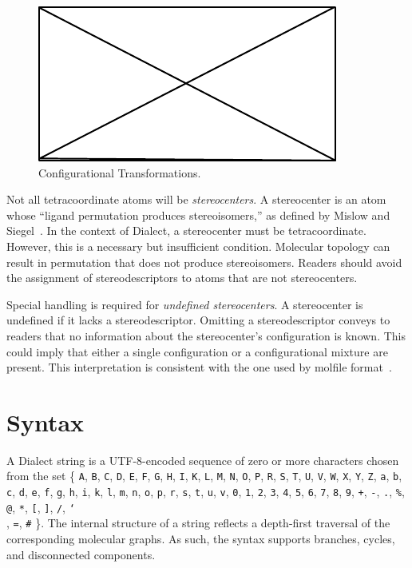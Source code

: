 \documentclass{article}
\def\ttt{\texttt}
\begin{document}
\begin{figure}
    \centering
    \includegraphics{filler}
    \caption{Configurational Transformations.}
    \label{fig:iconfigurational-transformations}
\end{figure}

Not all tetracoordinate atoms will be \textit{stereocenters}. A stereocenter is an atom whose \enquote{ligand permutation produces stereoisomers,} as defined by Mislow and Siegel~\cite{mislow:1984}. In the context of Dialect, a stereocenter must be tetracoordinate. However, this is a necessary but insufficient condition. Molecular topology can result in permutation that does not produce stereoisomers. Readers should avoid the assignment of stereodescriptors to atoms that are not stereocenters.

Special handling is required for \textit{undefined stereocenters}. A stereocenter is undefined if it lacks a stereodescriptor. Omitting a stereodescriptor conveys to readers that no information about the stereocenter's configuration is known. This could imply that either a single configuration or a configurational mixture are present. This interpretation is consistent with the one used by molfile format~\cite{ctfileFormats}.

\section*{Syntax}

A Dialect string is a UTF-8-encoded sequence of zero or more characters chosen from the set \{ \ttt{A}, \ttt{B}, \ttt{C}, \ttt{D}, \ttt{E}, \ttt{F}, \ttt{G}, \ttt{H}, \ttt{I}, \ttt{K}, \ttt{L}, \ttt{M}, \ttt{N}, \ttt{O}, \ttt{P}, \ttt{R}, \ttt{S}, \ttt{T}, \ttt{U}, \ttt{V}, \ttt{W}, \ttt{X}, \ttt{Y}, \ttt{Z}, \ttt{a}, \ttt{b}, \ttt{c}, \ttt{d}, \ttt{e}, \ttt{f}, \ttt{g}, \ttt{h}, \ttt{i}, \ttt{k}, \ttt{l}, \ttt{m}, \ttt{n}, \ttt{o}, \ttt{p}, \ttt{r}, \ttt{s}, \ttt{t}, \ttt{u}, \ttt{v}, \ttt{0}, \ttt{1}, \ttt{2}, \ttt{3}, \ttt{4}, \ttt{5}, \ttt{6}, \ttt{7}, \ttt{8}, \ttt{9}, \ttt{+}, \ttt{-}, \ttt{.}, \ttt{\%}, \ttt{@}, \ttt{*}, \ttt{[}, \ttt{]}, \ttt{/}, \ttt{\char`\\}, \ttt{=}, \ttt{\#} \}. The internal structure of a string reflects a depth-first traversal of the corresponding molecular graphs. As such, the syntax supports branches, cycles, and disconnected components.
\end{document}
